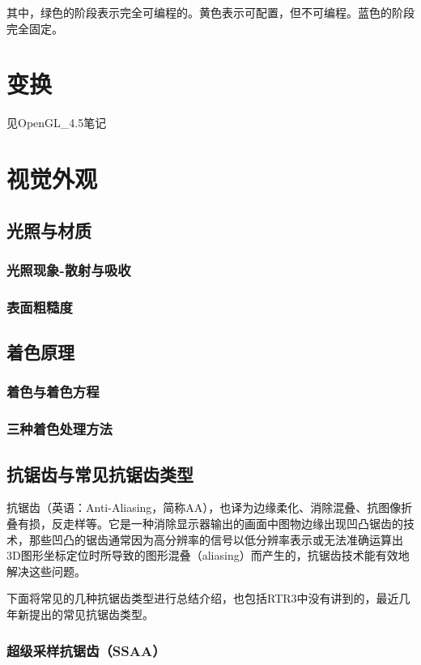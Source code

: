 \documentclass[UTF8,a4paper,12pt]{ctexbook}
\begin{document}
		其中，\color{olive}绿色的阶段表示完全可编程的。\color{yellow}黄色表示可配置，但不可编程。\color{blue}蓝色的阶段完全固定。\color{black}
\chapter{变换}
	见OpenGL\_4.5笔记


\chapter{视觉外观}
	\section{光照与材质}
		\subsection{光照现象-散射与吸收}
		
		\subsection{表面粗糙度}
		
	\section{着色原理}
		\subsection{着色与着色方程}
		
		\subsection{三种着色处理方法}
		
		
	\section{抗锯齿与常见抗锯齿类型}
		抗锯齿（英语：Anti-Aliasing，简称AA），也译为边缘柔化、消除混叠、抗图像折叠有损，反走样等。它是一种消除显示器输出的画面中图物边缘出现凹凸锯齿的技术，那些凹凸的锯齿通常因为高分辨率的信号以低分辨率表示或无法准确运算出3D图形坐标定位时所导致的图形混叠（aliasing）而产生的，抗锯齿技术能有效地解决这些问题。
		
		下面将常见的几种抗锯齿类型进行总结介绍，也包括RTR3中没有讲到的，最近几年新提出的常见抗锯齿类型。
		
		\subsection{超级采样抗锯齿（SSAA）}
		
\end{document}

